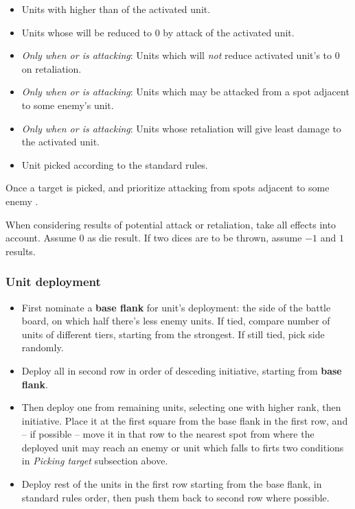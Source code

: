 \begin{multicols*}{2}
    
    \begin{itemize}
        \item Units with  higher than  of the activated unit.
        \item Units whose  will be reduced to $0$ by attack of the activated unit.
        \item \textit{Only when  or  is attacking}: Units which will \emph{not} reduce activated unit's  to $0$ on retaliation.
        \item \textit{Only when  or  is attacking}: Units which may be attacked from a spot adjacent to some enemy's  unit.
        \item \textit{Only when  or  is attacking}: Units whose retaliation will give least damage to the activated unit.
        \item Unit picked according to the standard rules.
    \end{itemize}
    
    Once a target is picked,  and  prioritize attacking from spots adjacent to some enemy .
   
    When considering results of potential attack or retaliation, take all effects into account.  Assume $0$ as die result. If two dices are to be thrown, assume $-1$ and $1$ results.
    
    \subsubsection*{Unit deployment}
    
    \begin{itemize}
        \item First nominate a \textbf{base flank} for unit's deployment: the side of the battle board, on which half there's less enemy units. If tied, compare number of units of different tiers, starting from the strongest. If still tied, pick side randomly.
        \item Deploy all  in second row in order of desceding initiative, starting from \textbf{base flank}.
        \item Then deploy one from remaining units, selecting one with higher rank, then initiative. Place it at the first square from the base flank in the first row, and -- if possible -- move it in that row to the nearest spot from where the deployed unit may reach an enemy  or unit which falls to firts two conditions in \textit{Picking target} subsection above.
        \item Deploy rest of the units in the first row starting from the base flank, in standard rules order, then push them back to second row where possible.
    \end{itemize}
\end{multicols*}
